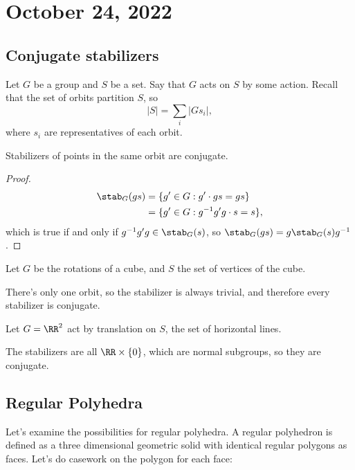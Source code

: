 \section{October 24, 2022}

\subsection{Conjugate stabilizers}

Let $G$ be a group and $S$ be a set. Say that $G$ acts on $S$ by some action. Recall that the set of orbits partition $S$, so 
\[\vert S\vert = \sum_i \vert Gs_i\vert,\]
where $s_i$ are representatives of each orbit.

\begin{theorem}
\proplabel

Stabilizers of points in the same orbit are conjugate.
\end{theorem}

\begin{proof}
\begin{align*}
    \stab_G(gs) &= \{g'\in G : g'\cdot gs = gs\} \\
    &= \{g'\in G : g^{-1}g'g\cdot s = s\},
\end{align*}
which is true if and only if $g^{-1}g'g\in \stab_G(s)$, so $\stab_G(gs) = g \stab_G(s)g^{-1}$.
\end{proof}

\begin{example}
\exlabel

Let $G$ be the rotations of a cube, and $S$ the set of vertices of the cube. 
\end{example}

There's only one orbit, so the stabilizer is always trivial, and therefore every stabilizer is conjugate. 

\begin{example}
\exlabel

Let $G = \RR^2$ act by translation on $S$, the set of horizontal lines. 
\end{example}

The stabilizers are all $\RR\times \{0\}$, which are normal subgroups, so they are conjugate. 

\subsection{Regular Polyhedra}

Let's examine the possibilities for regular polyhedra. A regular polyhedron is defined as a three dimensional geometric solid with identical regular polygons as faces. Let's do casework on the polygon for each face:

